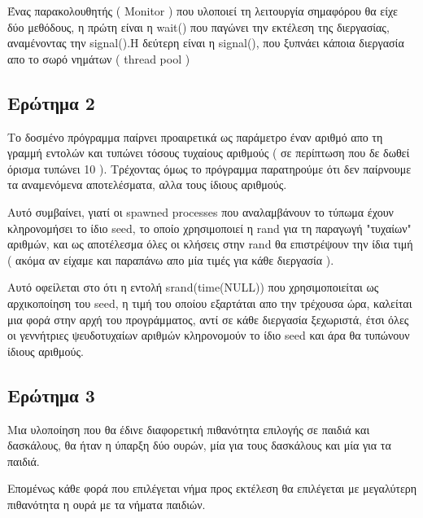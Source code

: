 \documentclass[12pt]{article}
\begin{document}
Ένας παρακολουθητής ( \textlatin{Monitor} ) που υλοποιεί τη λειτουργία σημαφόρου θα είχε δύο μεθόδους, η πρώτη είναι η  \textlatin{wait()} που παγώνει την εκτέλεση της διεργασίας, αναμένοντας την \textlatin{signal()}.Η δεύτερη είναι η \textlatin{signal()}, που ξυπνάει κάποια διεργασία απο το σωρό νημάτων ( \textlatin{thread pool} ) 


\subsection*{Ερώτημα 2}
Το δοσμένο πρόγραμμα παίρνει προαιρετικά ως παράμετρο έναν αριθμό απο τη γραμμή εντολών και τυπώνει τόσους τυχαίους αριθμούς ( σε περίπτωση που δε δωθεί όρισμα τυπώνει 10 ). Τρέχοντας όμως το πρόγραμμα παρατηρούμε ότι δεν παίρνουμε τα αναμενόμενα αποτελέσματα, αλλα τους ίδιους αριθμούς.

 Αυτό συμβαίνει, γιατί οι \textlatin{spawned processes} που αναλαμβάνουν το τύπωμα έχουν κληρονομήσει το ίδιο \textlatin{seed}, το οποίο χρησιμοποιεί η \textlatin{rand} για τη παραγωγή "τυχαίων" αριθμών, και ως αποτέλεσμα όλες οι κλήσεις στην \textlatin{rand} θα επιστρέψουν την ίδια τιμή ( ακόμα αν είχαμε και παραπάνω απο μία τιμές για κάθε διεργασία ).
 
 Αυτό οφείλεται στο ότι η εντολή \textlatin{srand(time(NULL))} που χρησιμοποιείται ως αρχικοποίηση του  \textlatin{seed}, η τιμή του οποίου εξαρτάται απο την τρέχουσα ώρα, καλείται μια φορά στην αρχή του προγράμματος, αντί σε κάθε διεργασία ξεχωριστά, έτσι όλες οι γεννήτριες ψευδοτυχαίων αριθμών κληρονομούν το ίδιο \textlatin{seed} και άρα θα τυπώνουν ίδιους αριθμούς.
 
 \subsection*{Ερώτημα 3}
 
 Μια υλοποίηση που θα έδινε διαφορετική πιθανότητα επιλογής σε παιδιά και δασκάλους, θα ήταν η ύπαρξη δύο ουρών, μία για τους δασκάλους και μία για τα παιδιά.

 Επομένως κάθε φορά που επιλέγεται νήμα προς εκτέλεση θα επιλέγεται με μεγαλύτερη πιθανότητα η ουρά με τα νήματα παιδιών.
\end{document}
